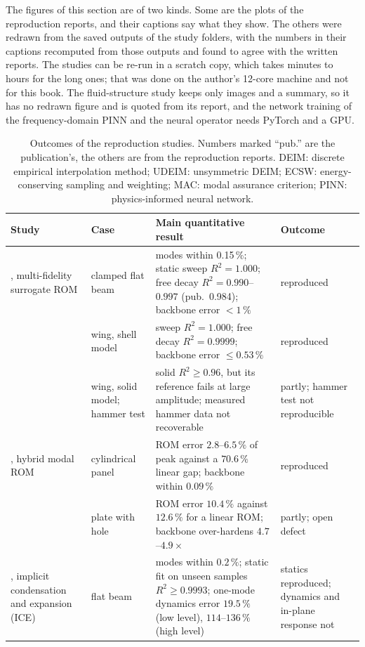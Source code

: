 The figures of this section are of two kinds. Some are the plots of the reproduction reports, and their captions say what they show. The others were redrawn from the saved outputs of the study folders, with the numbers in their captions recomputed from those outputs and found to agree with the written reports. The studies can be re-run in a scratch copy, which takes minutes to hours for the long ones; that was done on the author's 12-core machine and not for this book. The fluid-structure study keeps only images and a summary, so it has no redrawn figure and is quoted from its report, and the network training of the frequency-domain PINN and the neural operator needs PyTorch and a GPU.

\begin{table}[tbp]
\centering\footnotesize
\setlength{\tabcolsep}{3pt}
\caption{Outcomes of the reproduction studies. Numbers marked ``pub.'' are the publication's, the others are from the reproduction reports. DEIM: discrete empirical interpolation method; UDEIM: unsymmetric DEIM; ECSW: energy-conserving sampling and weighting; MAC: modal assurance criterion; PINN: physics-informed neural network.}\label{tab:vf-repro}
\begin{tabularx}{\linewidth}{@{}>{\raggedright\arraybackslash}p{2.35cm} >{\raggedright\arraybackslash}p{2.4cm} >{\raggedright\arraybackslash}X >{\raggedright\arraybackslash}p{2.35cm}@{}}
\toprule
Study & Case & Main quantitative result & Outcome \\
\midrule
\citet{he2023mfsnlrom}, multi-fidelity surrogate ROM & clamped flat beam & modes within 0.15\,\%; static sweep $R^2=1.000$; free decay $R^2=0.990$--$0.997$ (pub.\ 0.984); backbone error $<1\,\%$ & reproduced \\
 & wing, shell model & sweep $R^2=1.000$; free decay $R^2=0.9999$; backbone error $\le0.53\,\%$ & reproduced \\
 & wing, solid model; hammer test & solid $R^2\ge0.96$, but its reference fails at large amplitude; measured hammer data not recoverable & partly; hammer test not reproducible \\
\addlinespace
\citet{yang2019hybrid}, hybrid modal ROM & cylindrical panel & ROM error $2.8$--$6.5\,\%$ of peak against a $70.6\,\%$ linear gap; backbone within $0.09\,\%$ & reproduced \\
 & plate with hole & ROM error $10.4\,\%$ against $12.6\,\%$ for a linear ROM; backbone over-hardens $4.7$--$4.9\times$ & partly; open defect \\
\addlinespace
\citet{hollkamp2008ice}, implicit condensation and expansion (ICE) & flat beam & modes within $0.2\,\%$; static fit on unseen samples $R^2\ge0.9993$; one-mode dynamics error $19.5\,\%$ (low level), $114$--$136\,\%$ (high level) & statics reproduced; dynamics and in-plane response not \\

\end{tabularx}
\end{table}
